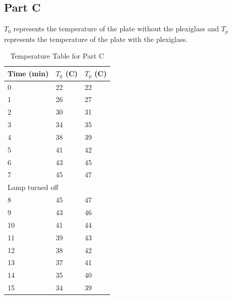 \documentclass[a4paper, 12pt, english]{article}
\begin{document}
\subsection{Part C}
$T_0$ represents the temperature of the plate without the plexiglass and $T_p$
represents the temperature of the plate with the plexiglass.
\begin{table}[H]
	\centering
	\caption{Temperature Table for Part C}
	\label{tab:table3}
	\begin{tabular}{@{}lll@{}}
		\toprule
		\textbf{Time (min)} & \textbf{$T_0$ (\degree C)} & \textbf{$T_p$ (\degree C)} \\ \midrule
		0                   & 22                         & 22                         \\
		1                   & 26                         & 27                         \\
		2                   & 30                         & 31                         \\
		3                   & 34                         & 35                         \\
		4                   & 38                         & 39                         \\
		5                   & 41                         & 42                         \\
		6                   & 43                         & 45                         \\
		7                   & 45                         & 47                         \\
		\bottomrule \multicolumn{3}{l}{Lamp turned off}                                          \\ \bottomrule
		8                   & 45                         & 47                         \\
		9                   & 43                         & 46                         \\
		10                  & 41                         & 44                         \\
		11                  & 39                         & 43                         \\
		12                  & 38                         & 42                         \\
		13                  & 37                         & 41                         \\
		14                  & 35                         & 40                         \\
		15                  & 34                         & 39                         \\
		\bottomrule
	\end{tabular}
\end{table}
\end{document}
